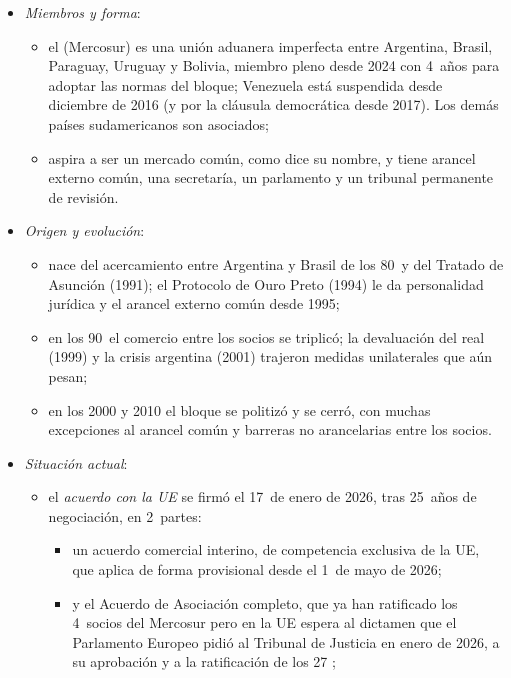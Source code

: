 \documentclass[11pt]{article}
\begin{document}
\begin{itemize}
\item \emph{Miembros y forma}:
  \begin{itemize}
  \item el  (Mercosur) es una unión aduanera imperfecta entre Argentina, Brasil, Paraguay, Uruguay y Bolivia, miembro pleno desde 2024 con 4~años para adoptar las normas del bloque\nocite{AgenciaGov2024Bolivia}; Venezuela está suspendida desde diciembre de 2016 (y por la cláusula democrática desde 2017). Los demás países sudamericanos son asociados;
  \item aspira a ser un mercado común, como dice su nombre, y tiene arancel externo común, una secretaría, un parlamento y un tribunal permanente de revisión.
  \end{itemize}
\item \emph{Origen y evolución}:
  \begin{itemize}
  \item nace del acercamiento entre Argentina y Brasil de los 80~y del Tratado de Asunción (1991); el Protocolo de Ouro Preto (1994) le da personalidad jurídica y el arancel externo común desde 1995;
  \item en los 90~el comercio entre los socios se triplicó; la devaluación del real (1999) y la crisis argentina (2001) trajeron medidas unilaterales que aún pesan;
  \item en los 2000 y 2010 el bloque se politizó y se cerró, con muchas excepciones al arancel común y barreras no arancelarias entre los socios.
  \end{itemize}
\item \emph{Situación actual}:
  \begin{itemize}
  \item el \emph{acuerdo con la UE} se firmó el 17~de enero de 2026, tras 25~años de negociación, en 2~partes\nocite{Consejo2026Mercosur}:
    \begin{itemize}
    \item un acuerdo comercial interino, de competencia exclusiva de la UE, que aplica de forma provisional desde el 1~de mayo de 2026\nocite{CE2026MercosurProvisional};
    \item y el Acuerdo de Asociación completo, que ya han ratificado los 4~socios del Mercosur pero en la UE espera al dictamen que el Parlamento Europeo pidió al Tribunal de Justicia en enero de 2026, a su aprobación y a la ratificación de los 27\nocite{PE2026Mercosur} ;
    \end{itemize}

\end{itemize}
\end{itemize}
\end{document}
